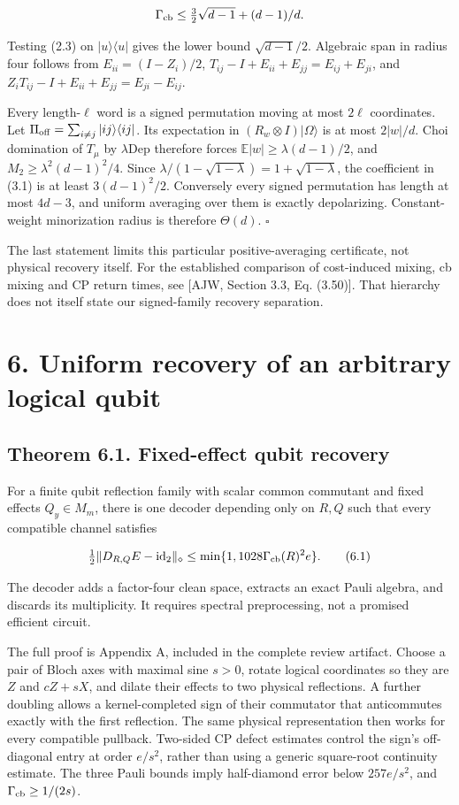 \documentclass[11pt]{article}
\begin{document}
\[
\Gamma_{\rm cb}\le\tfrac32\sqrt{d-1}+(d-1)/d.
\]

Testing (2.3) on \(|u\rangle\langle u|\) gives the lower bound
\(\sqrt{d-1}/2\). Algebraic span in radius four follows from
\(E_{ii}=(I-Z_i)/2\),
\(T_{ij}-I+E_{ii}+E_{jj}=E_{ij}+E_{ji}\), and
\(Z_iT_{ij}-I+E_{ii}+E_{jj}=E_{ji}-E_{ij}\).

Every length-\(\ell\) word is a signed permutation moving at most
\(2\ell\) coordinates. Let \(\Pi_{\rm off}=\sum_{i\ne j}|ij\rangle
\langle ij|\). Its expectation in \((R_w\otimes I)|\Omega\rangle\)
is at most \(2|w|/d\). Choi domination of \(T_\mu\) by
\(\lambda\mathrm{Dep}\) therefore forces
\(\mathbb E|w|\ge\lambda(d-1)/2\), and
\(M_2\ge\lambda^2(d-1)^2/4\). Since
\(\lambda/(1-\sqrt{1-\lambda})=1+\sqrt{1-\lambda}\), the coefficient
in (3.1) is at least \(3(d-1)^2/2\).
Conversely every signed permutation has length at most \(4d-3\), and
uniform averaging over them is exactly depolarizing. Constant-weight
minorization radius is therefore \(\Theta(d)\). \hfill\(\square\)

The last statement limits this particular positive-averaging certificate,
not physical recovery itself. For the established comparison of cost-induced
mixing, cb mixing and CP return times, see [AJW, Section 3.3, Eq. (3.50)].
That hierarchy does not itself state our signed-family recovery separation.

\section*{6. Uniform recovery of an arbitrary logical qubit}

\subsection*{Theorem 6.1. Fixed-effect qubit recovery}

For a finite qubit reflection family with scalar common commutant and fixed
effects \(Q_y\in M_m\), there is one decoder depending only on \(R,Q\) such
that every compatible channel satisfies

\[
\tfrac12\|D_{R,Q}E-\mathrm{id}_2\|_\diamond
\le\min\{1,1028\Gamma_{\rm cb}(R)^2e\}.
\tag{6.1}
\]

The decoder adds a factor-four clean space, extracts an exact Pauli algebra,
and discards its multiplicity. It requires spectral preprocessing, not a
promised efficient circuit.

The full proof is Appendix A, included in the complete review artifact.
Choose a pair of Bloch axes with maximal sine
\(s>0\), rotate logical coordinates so they are \(Z\) and \(cZ+sX\),
and dilate their effects to two physical reflections. A further doubling
allows a kernel-completed sign of their commutator that anticommutes exactly
with the first reflection. The same physical representation then works for
every compatible pullback. Two-sided CP defect estimates control the sign's
off-diagonal entry at order \(e/s^2\), rather than using a generic
square-root continuity estimate. The three Pauli bounds imply half-diamond
error below \(257e/s^2\), and \(\Gamma_{\rm cb}\ge1/(2s)\).
\end{document}
